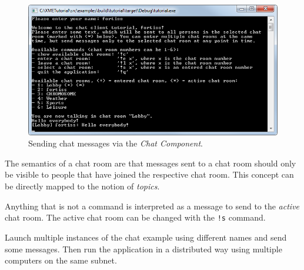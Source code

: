 \begin{enumerate}
\begin{figure}[htpb]
	\centering
	\includegraphics[scale=0.75]{figures/PNG/example_chat.png}
	\caption{Sending chat messages via the \emph{Chat Component}.}
	\label{fig:example_chat}
\end{figure}

		The semantics of a chat room are that messages sent to a chat room should only be visible to people that have joined the respective chat room.
		This concept can be directly mapped to the notion of \emph{topics}.
		
		Anything that is not a command is interpreted as a message to send to the \emph{active} chat room.
		The active chat room can be changed with the \texttt{!s} command.
		
		Launch multiple instances of the chat example using different names and send some messages.
		Then run the application in a distributed way using multiple computers on the same subnet.

\end{enumerate}

